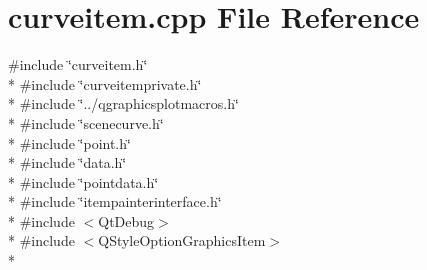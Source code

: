\section{curveitem.\+cpp File Reference}
\label{bk3_2curve_2curveitem_8cpp}
{\ttfamily \#include \char`\"{}curveitem.\+h\char`\"{}}\\*
{\ttfamily \#include \char`\"{}curveitemprivate.\+h\char`\"{}}\\*
{\ttfamily \#include \char`\"{}../qgraphicsplotmacros.\+h\char`\"{}}\\*
{\ttfamily \#include \char`\"{}scenecurve.\+h\char`\"{}}\\*
{\ttfamily \#include \char`\"{}point.\+h\char`\"{}}\\*
{\ttfamily \#include \char`\"{}data.\+h\char`\"{}}\\*
{\ttfamily \#include \char`\"{}pointdata.\+h\char`\"{}}\\*
{\ttfamily \#include \char`\"{}itempainterinterface.\+h\char`\"{}}\\*
{\ttfamily \#include $<$Qt\+Debug$>$}\\*
{\ttfamily \#include $<$Q\+Style\+Option\+Graphics\+Item$>$}\\*
